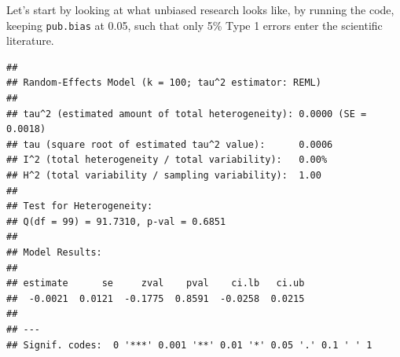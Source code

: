 \documentclass[
  oneside]{krantz}
\makeatletter
\newenvironment{Shaded}{\begin{snugshade}}{\end{snugshade}}
\newcommand{\AttributeTok}[1]{\textcolor[rgb]{0.61,0.61,0.61}{#1}}
\newcommand{\CommentTok}[1]{\textcolor[rgb]{0.37,0.37,0.37}{\textit{#1}}}
\newcommand{\DecValTok}[1]{\textcolor[rgb]{0.06,0.06,0.06}{#1}}
\newcommand{\FloatTok}[1]{\textcolor[rgb]{0.06,0.06,0.06}{#1}}
\newcommand{\FunctionTok}[1]{\textcolor[rgb]{0,0,0}{#1}}
\newcommand{\NormalTok}[1]{#1}
\newcommand{\OtherTok}[1]{\textcolor[rgb]{0.37,0.37,0.37}{#1}}
\newcommand{\SpecialCharTok}[1]{\textcolor[rgb]{0,0,0}{#1}}
\newcommand{\StringTok}[1]{\textcolor[rgb]{0.5,0.5,0.5}{#1}}
\newenvironment{kframe}{%
\medskip{}
\setlength{\fboxsep}{.8em}
 \def\at@end@of@kframe{}%
 \ifinner\ifhmode%
  \def\at@end@of@kframe{\end{minipage}}%
  \begin{minipage}{\columnwidth}%
 \fi\fi%
 \def\FrameCommand##1{\hskip\@totalleftmargin \hskip-\fboxsep
 \colorbox{shadecolor}{##1}\hskip-\fboxsep
     \hskip-\linewidth \hskip-\@totalleftmargin \hskip\columnwidth}%
 \MakeFramed {\advance\hsize-\width
   \@totalleftmargin\z@ \linewidth\hsize
   \@setminipage}}%
 {\par\unskip\endMakeFramed%
 \at@end@of@kframe}
\renewenvironment{Shaded}{\begin{kframe}}{\end{kframe}}
\makeatother
\begin{document}
\begin{Shaded}
\end{Shaded}

Let's start by looking at what unbiased research looks like, by running the code, keeping \texttt{pub.bias} at 0.05, such that only 5\% Type 1 errors enter the scientific literature.

\begin{verbatim}
## 
## Random-Effects Model (k = 100; tau^2 estimator: REML)
## 
## tau^2 (estimated amount of total heterogeneity): 0.0000 (SE = 0.0018)
## tau (square root of estimated tau^2 value):      0.0006
## I^2 (total heterogeneity / total variability):   0.00%
## H^2 (total variability / sampling variability):  1.00
## 
## Test for Heterogeneity:
## Q(df = 99) = 91.7310, p-val = 0.6851
## 
## Model Results:
## 
## estimate      se     zval    pval    ci.lb   ci.ub   ​ 
##  -0.0021  0.0121  -0.1775  0.8591  -0.0258  0.0215    
## 
## ---
## Signif. codes:  0 '***' 0.001 '**' 0.01 '*' 0.05 '.' 0.1 ' ' 1
\end{verbatim}
\end{document}

